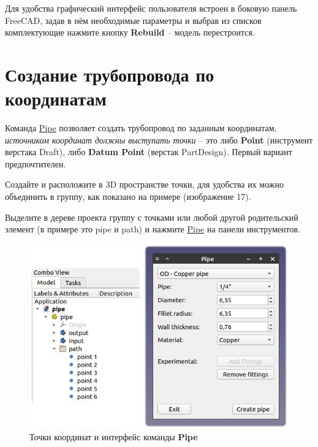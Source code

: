 \documentclass[a4paper,12pt]{article}
\begin{document}
Для удобства графический интерфейс пользователя встроен в боковую панель FreeCAD, задав в нём необходимые параметры и выбрав из списков комплектующие нажмите кнопку \textbf{Rebuild} -- модель перестроится.

\pagebreak




\section{Создание трубопровода по координатам}

Команда \hyperref[sec:6]{Pipe} позволяет создать трубопровод по заданным координатам,
\emph{источником координат должны выступать точки} -- это либо \textbf{Point} (инструмент верстака Draft), либо \textbf{Datum Point} (верстак PartDesign). Первый вариант предпочтителен.

Создайте и расположите в 3D пространстве точки, для удобства их можно объединить в группу, как показано на примере (изображение 17).

Выделите в дереве проекта группу с точками или любой другой родительский элемент (в примере это pipe и path) и нажмите \hyperref[sec:6]{Pipe} на панели инструментов.

\begin{figure}[htp]
	\centering
	\includegraphics[scale=1]{img/pipe.png}
	\caption{Точки координат и интерфейс команды \textbf{Pipe}}
	\label{sec:pipe}
\end{figure}
\end{document}
